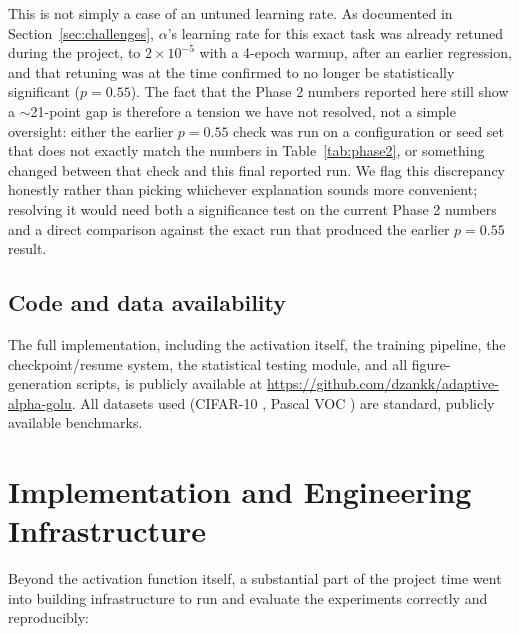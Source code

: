 \documentclass[conference]{IEEEtran}
\begin{document}
This is not simply a case of an untuned learning rate. As documented in Section~\ref{sec:challenges}, $\alpha$'s learning rate for this exact task was already retuned during the project, to $2\times10^{-5}$ with a 4-epoch warmup, after an earlier regression, and that retuning was at the time confirmed to no longer be statistically significant ($p=0.55$). The fact that the Phase 2 numbers reported here still show a $\sim$21-point gap is therefore a tension we have not resolved, not a simple oversight: either the earlier $p=0.55$ check was run on a configuration or seed set that does not exactly match the numbers in Table~\ref{tab:phase2}, or something changed between that check and this final reported run. We flag this discrepancy honestly rather than picking whichever explanation sounds more convenient; resolving it would need both a significance test on the current Phase 2 numbers and a direct comparison against the exact run that produced the earlier $p=0.55$ result.

\subsection{Code and data availability}

The full implementation, including the activation itself, the training pipeline, the checkpoint/resume system, the statistical testing module, and all figure-generation scripts, is publicly available at \url{https://github.com/dzankk/adaptive-alpha-golu}. All datasets used (CIFAR-10 \cite{cifar10}, Pascal VOC \cite{pascalvoc}) are standard, publicly available benchmarks.

\section{Implementation and Engineering Infrastructure}

Beyond the activation function itself, a substantial part of the project time went into building infrastructure to run and evaluate the experiments correctly and reproducibly:
\end{document}
